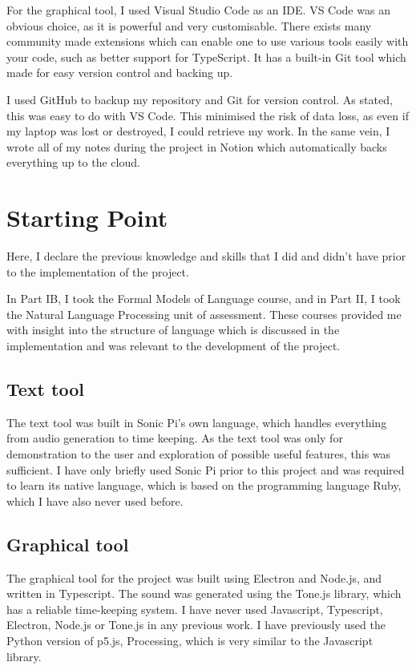 \documentclass[12pt,a4paper,twoside,openright]{report}
\begin{document}
For the graphical tool, I used Visual Studio Code as an IDE. VS Code was an obvious choice, as it is powerful and very customisable. There exists many community made extensions which can enable one to use various tools easily with your code, such as better support for TypeScript. It has a built-in Git tool which made for easy version control and backing up.

I used GitHub to backup my repository and Git for version control. As stated, this was easy to do with VS Code. This minimised the risk of data loss, as even if my laptop was lost or destroyed, I could retrieve my work. In the same vein, I wrote all of my notes during the project in Notion which automatically backs everything up to the cloud.

\section{Starting Point}
Here, I declare the previous knowledge and skills that I did and didn't have prior to the implementation of the project.

In Part IB, I took the Formal Models of Language course, and in Part II, I took the Natural Language Processing unit of assessment. These courses provided me with insight into the structure of language which is discussed in the implementation and was relevant to the development of the project.

\subsection{Text tool}
The text tool was built in Sonic Pi's own language, which handles everything from audio generation to time keeping. As the text tool was only for demonstration to the user and exploration of possible useful features, this was sufficient. I have only briefly used Sonic Pi prior to this project and was required to learn its native language, which is based on the programming language Ruby, which I have also never used before.

\subsection{Graphical tool}
The graphical tool for the project was built using Electron and Node.js, and written in Typescript. The sound was generated using the Tone.js library, which has a reliable time-keeping system. I have never used Javascript, Typescript, Electron, Node.js or Tone.js in any previous work. I have previously used the Python version of p5.js, Processing, which is very similar to the Javascript library.
\end{document}
